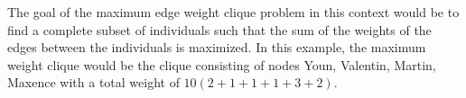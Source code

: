 The goal of the maximum edge weight clique problem in this context would be to find a complete subset of individuals such that the sum of the weights of the edges between the individuals is maximized. In this example, the maximum weight clique would be the clique consisting of nodes Youn, Valentin, Martin, Maxence with a total weight of $10(2+1+1+1+3+2)$.





\newpage